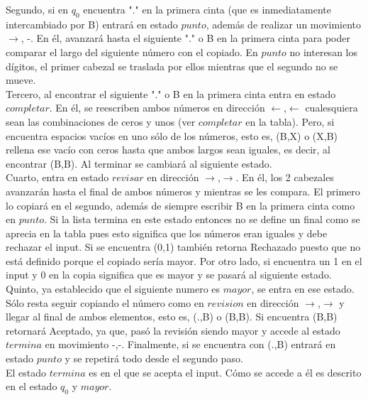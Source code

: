 \documentclass[12pt]{article}
\begin{document}
Segundo, si en $q_{0}$ encuentra "." en la primera cinta (que es inmediatamente intercambiado por B) entrará en estado $punto$, además de realizar un movimiento $\rightarrow$, -. En él, avanzará hasta el siguiente "." o B en la primera cinta para poder comparar el largo del siguiente número con el copiado. En $punto$ no interesan los dígitos, el primer cabezal se traslada por ellos mientras que el segundo no se mueve.\\

Tercero, al encontrar el siguiente "." o B en la primera cinta entra en estado $completar$. En él, se reescriben ambos números en dirección $\leftarrow$,$\leftarrow$ cualesquiera sean las combinaciones de ceros y unos (ver $completar$ en la tabla). Pero, si encuentra espacios vacíos en uno sólo de los números, esto es, (B,X) o (X,B) rellena ese vacío con ceros hasta que ambos largos sean iguales, es decir, al encontrar (B,B). Al terminar se cambiará al siguiente estado.\\

Cuarto, entra en estado $revisar$ en dirección $\rightarrow$,$\rightarrow$. En él, los 2 cabezales avanzarán hasta el final de ambos números y mientras se les compara. El primero lo copiará en el segundo, además de siempre escribir B en la primera cinta como en $punto$. Si la lista termina en este estado entonces no se define un final como se aprecia en la tabla pues esto significa que los números eran iguales y debe rechazar el input. Si se encuentra (0,1) también retorna Rechazado puesto que no está definido porque el copiado sería mayor. Por otro lado, si encuentra un 1 en el input y 0 en la copia significa que es mayor y se pasará al siguiente estado.\\

Quinto, ya establecido que el siguiente numero es $mayor$, se entra en ese estado. Sólo resta seguir copiando el número como en $revision$ en dirección $\rightarrow$,$\rightarrow$ y llegar al final de ambos elementos, esto es, (.,B) o (B,B). Si encuentra (B,B) retornará Aceptado, ya que, pasó la revisión siendo mayor y accede al estado $termina$ en movimiento -,-. Finalmente, si se encuentra con (.,B) entrará en estado $punto$ y se repetirá todo desde el segundo paso.\\

El estado $termina$ es en el que se acepta el input. Cómo se accede a él es descrito en el estado $q_{0}$ y $mayor$.

\vspace{5ex}
\end{document}
